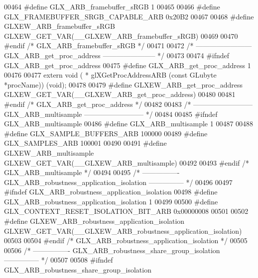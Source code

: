 \begin{DoxyCode}
00464 \textcolor{preprocessor}{#define GLX\_ARB\_framebuffer\_sRGB 1}
00465 
00466 \textcolor{preprocessor}{#define GLX\_FRAMEBUFFER\_SRGB\_CAPABLE\_ARB 0x20B2}
00467 
00468 \textcolor{preprocessor}{#define GLXEW\_ARB\_framebuffer\_sRGB GLXEW\_GET\_VAR(\_\_GLXEW\_ARB\_framebuffer\_sRGB)}
00469 
00470 \textcolor{preprocessor}{#endif }\textcolor{comment}{/* GLX\_ARB\_framebuffer\_sRGB */}\textcolor{preprocessor}{}
00471 
00472 \textcolor{comment}{/* ------------------------ GLX\_ARB\_get\_proc\_address ----------------------- */}
00473 
00474 \textcolor{preprocessor}{#ifndef GLX\_ARB\_get\_proc\_address}
00475 \textcolor{preprocessor}{#define GLX\_ARB\_get\_proc\_address 1}
00476 
00477 \textcolor{keyword}{extern} void ( * glXGetProcAddressARB (\textcolor{keyword}{const} GLubyte *procName)) (void);
00478 
00479 \textcolor{preprocessor}{#define GLXEW\_ARB\_get\_proc\_address GLXEW\_GET\_VAR(\_\_GLXEW\_ARB\_get\_proc\_address)}
00480 
00481 \textcolor{preprocessor}{#endif }\textcolor{comment}{/* GLX\_ARB\_get\_proc\_address */}\textcolor{preprocessor}{}
00482 
00483 \textcolor{comment}{/* -------------------------- GLX\_ARB\_multisample -------------------------- */}
00484 
00485 \textcolor{preprocessor}{#ifndef GLX\_ARB\_multisample}
00486 \textcolor{preprocessor}{#define GLX\_ARB\_multisample 1}
00487 
00488 \textcolor{preprocessor}{#define GLX\_SAMPLE\_BUFFERS\_ARB 100000}
00489 \textcolor{preprocessor}{#define GLX\_SAMPLES\_ARB 100001}
00490 
00491 \textcolor{preprocessor}{#define GLXEW\_ARB\_multisample GLXEW\_GET\_VAR(\_\_GLXEW\_ARB\_multisample)}
00492 
00493 \textcolor{preprocessor}{#endif }\textcolor{comment}{/* GLX\_ARB\_multisample */}\textcolor{preprocessor}{}
00494 
00495 \textcolor{comment}{/* ---------------- GLX\_ARB\_robustness\_application\_isolation --------------- */}
00496 
00497 \textcolor{preprocessor}{#ifndef GLX\_ARB\_robustness\_application\_isolation}
00498 \textcolor{preprocessor}{#define GLX\_ARB\_robustness\_application\_isolation 1}
00499 
00500 \textcolor{preprocessor}{#define GLX\_CONTEXT\_RESET\_ISOLATION\_BIT\_ARB 0x00000008}
00501 
00502 \textcolor{preprocessor}{#define GLXEW\_ARB\_robustness\_application\_isolation
       GLXEW\_GET\_VAR(\_\_GLXEW\_ARB\_robustness\_application\_isolation)}
00503 
00504 \textcolor{preprocessor}{#endif }\textcolor{comment}{/* GLX\_ARB\_robustness\_application\_isolation */}\textcolor{preprocessor}{}
00505 
00506 \textcolor{comment}{/* ---------------- GLX\_ARB\_robustness\_share\_group\_isolation --------------- */}
00507 
00508 \textcolor{preprocessor}{#ifndef GLX\_ARB\_robustness\_share\_group\_isolation}

\end{DoxyCode}
